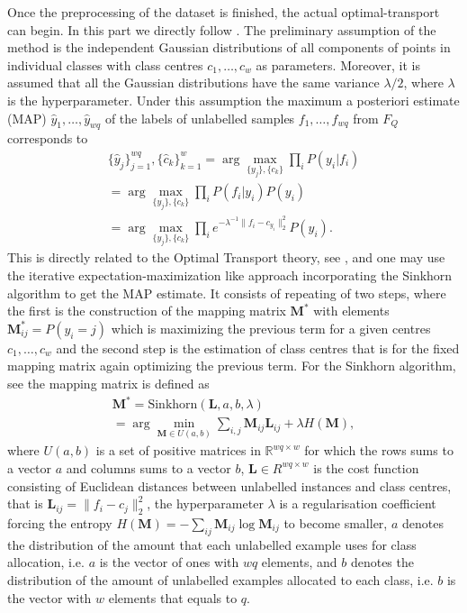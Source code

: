 \documentclass[letterpaper]{article} \usepackage{aaai20}  \usepackage{times}  \usepackage{helvet} \usepackage{courier}  \usepackage[hyphens]{url}  \usepackage{graphicx} \urlstyle{rm} \def\UrlFont{\rm}  \usepackage{graphicx}  \frenchspacing  \setlength{\pdfpagewidth}{8.5in}  \setlength{\pdfpageheight}{11in}  \usepackage[ruled,vlined]{algorithm2e}
\begin{document}
Once the preprocessing of the dataset is finished, the actual optimal-transport can begin. In this part we directly follow \cite{hu2020leveraging}.
The preliminary assumption of the method is the independent Gaussian distributions of all components of points in individual classes with class centres $c_1, \dots, c_w$ as parameters. Moreover, it is assumed that all the Gaussian distributions have the same variance $\lambda/2$, where $\lambda$ is the hyperparameter.
Under this assumption the maximum a posteriori estimate (MAP) $\hat y_1, \dots, \hat y_{wq}$ of 
the labels of unlabelled samples $f_1, \dots, f_{wq}$ from $F_Q$ corresponds to
\begin{multline*}
    \{\hat y_j\}_{j=1}^{wq}, \{\hat c_k\}_{k=1}^w =  \arg\max_{\{y_j\}, \{c_k\}} \prod_i P(y_i | f_i) \\
    = \arg\max_{\{y_j\}, \{c_k\}} \prod_i P(f_i | y_i) P(y_i) \\
    = \arg\max_{\{y_j\}, \{c_k\}} \prod_i e^{-\lambda^{-1} \|f_i - c_{y_i}\|_2^2} P(y_i).
\end{multline*}
This is directly related to the Optimal Transport theory, see \cite{hu2020leveraging,marco2013Sinkhorn,berman2020,villani2003},
and one may use the iterative expectation-maximization like approach incorporating the Sinkhorn algorithm to get the MAP estimate.
It consists of repeating of two steps, where the first is the construction of the mapping matrix $\mathbf M^*$ with elements $\mathbf M^*_{ij} = P(y_i = j)$ which is maximizing the previous term for a given centres $c_1, \dots, c_w$ and the second step is the estimation of class centres 
that is for the fixed 
mapping matrix again optimizing the previous term.
For the Sinkhorn algorithm, see  \cite{marco2013Sinkhorn} the mapping matrix is defined as
\begin{multline*}
    \mathbf M^* = \mathrm{Sinkhorn}(\mathbf L,a,b,\lambda) \\
    = \arg\min_{\mathbf M\in U(a,b)}\sum_{i, j}\mathbf M_{ij} \mathbf L_{ij} + \lambda H(\mathbf M),
\end{multline*}
where $U(a,b)$ is a set of positive matrices in $\mathbb R^{wq\times w}$ for which the rows sums to a vector $a$ and columns sums to a vector $b$, 
$\mathbf L\in R^{wq\times w}$ is the cost function consisting of Euclidean distances between unlabelled instances and class centres, that is 
$\mathbf L_{ij} = \|f_i - c_{j}\|_2^2$, the hyperparameter $\lambda$ is a regularisation coefficient forcing the entropy 
$H(\mathbf M)=-\sum_{ij} \mathbf M_{ij}\log \mathbf M_{ij}$ to become smaller, 
$a$ denotes the distribution of the amount that each unlabelled example uses for class allocation, i.e. $a$ is the vector of ones with $wq$ elements, 
and $b$ denotes the distribution of the amount of unlabelled examples allocated to each class, i.e. $b$ is the vector with $w$ elements that equals to $q$.
\end{document}
